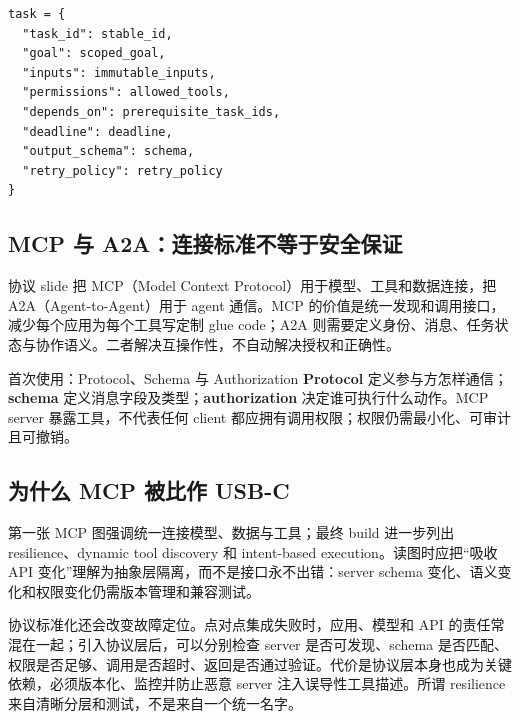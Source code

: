 
\begin{lstlisting}[caption={Manager--worker 任务合同}]
task = {
  "task_id": stable_id,
  "goal": scoped_goal,
  "inputs": immutable_inputs,
  "permissions": allowed_tools,
  "depends_on": prerequisite_task_ids,
  "deadline": deadline,
  "output_schema": schema,
  "retry_policy": retry_policy
}
\end{lstlisting}

\subsection{MCP 与 A2A：连接标准不等于安全保证}

协议 slide 把 MCP（Model Context Protocol）用于模型、工具和数据连接，把 A2A（Agent-to-Agent）用于 agent 通信。MCP 的价值是统一发现和调用接口，减少每个应用为每个工具写定制 glue code；A2A 则需要定义身份、消息、任务状态与协作语义。二者解决互操作性，不自动解决授权和正确性。


\begin{knowledgebox}{首次使用：Protocol、Schema 与 Authorization}
\textbf{Protocol} 定义参与方怎样通信；\textbf{schema} 定义消息字段及类型；\textbf{authorization} 决定谁可执行什么动作。MCP server 暴露工具，不代表任何 client 都应拥有调用权限；权限仍需最小化、可审计且可撤销。
\end{knowledgebox}

\subsection{为什么 MCP 被比作 USB-C}

第一张 MCP 图强调统一连接模型、数据与工具；最终 build 进一步列出 resilience、dynamic tool discovery 和 intent-based execution。读图时应把“吸收 API 变化”理解为抽象层隔离，而不是接口永不出错：server schema 变化、语义变化和权限变化仍需版本管理和兼容测试。



协议标准化还会改变故障定位。点对点集成失败时，应用、模型和 API 的责任常混在一起；引入协议层后，可以分别检查 server 是否可发现、schema 是否匹配、权限是否足够、调用是否超时、返回是否通过验证。代价是协议层本身也成为关键依赖，必须版本化、监控并防止恶意 server 注入误导性工具描述。所谓 resilience 来自清晰分层和测试，不是来自一个统一名字。

